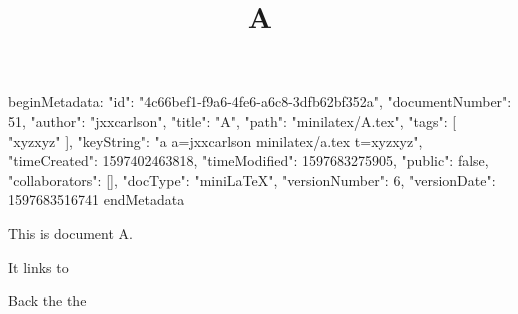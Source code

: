 beginMetadata:
{
    "id": "4c66bef1-f9a6-4fe6-a6c8-3dfb62bf352a",
    "documentNumber": 51,
    "author": "jxxcarlson",
    "title": "A",
    "path": "minilatex/A.tex",
    "tags": [
        "xyzxyz"
    ],
    "keyString": "a a=jxxcarlson minilatex/a.tex t=xyzxyz",
    "timeCreated": 1597402463818,
    "timeModified": 1597683275905,
    "public": false,
    "collaborators": [],
    "docType": "miniLaTeX",
    "versionNumber": 6,
    "versionDate": 1597683516741
}
endMetadata
\title{A}

\maketitle

This is document A.

It links to 

Back the the 

